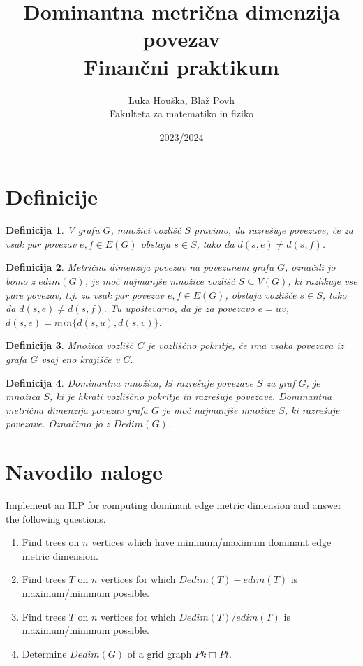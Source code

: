 \documentclass[a4paper,12pt]{article}
\title{Dominantna metrična dimenzija povezav \\ 
\Large Finančni praktikum}
\author{Luka Houška, Blaž Povh \\
Fakulteta za matematiko in fiziko}
\date{2023/2024}
\newtheorem{definicija}{Definicija}
\begin{document}
\maketitle

\section{Definicije}
    \begin{definicija}
        V grafu $G$, množici vozlišč $S$ pravimo, da razrešuje povezave, če za vsak par povezav $e, f \in E(G)$ obstaja $s \in S$, tako da $d(s, e) \neq  d(s, f)$.
    \end{definicija}

    \begin{definicija}
        Metrična dimenzija povezav na  povezanem grafu $G$, označili jo bomo z $edim(G)$, je moč najmanjše množice vozlišč $S\subseteq V(G)$, ki razlikuje vse pare povezav, t.j. za vsak par povezav $e, f \in E(G)$, obstaja vozlišče $s \in S$, tako da $d(s, e) \neq d(s, f )$. Tu upoštevamo, da je za povezavo $e=uv$, $d(s, e) = min\{d(s, u), d(s, v)\}$.
    \end{definicija}
        
    \begin{definicija}
        Množica vozlišč $C$ je \emph{vozliščno pokritje}, če ima vsaka povezava iz grafa $G$ vsaj eno krajišče v $C$.
    \end{definicija}

    \begin{definicija}
        Dominantna množica, ki razrešuje povezave $S$ za graf $G$, je množica $S$, ki je hkrati vozliščno pokritje in razrešuje povezave. Dominantna metrična dimenzija povezav grafa $G$ je moč najmanjše množice $S$, ki razrešuje povezave. Označimo jo z $Dedim(G)$.
    \end{definicija}

\section{Navodilo naloge}
    Implement an ILP for computing dominant edge metric dimension and answer the following questions.
    \begin{enumerate}
        \item Find trees on $n$ vertices which have minimum/maximum dominant edge metric dimension.
        \item Find trees $T$ on $n$ vertices for which $Dedim(T) - edim(T)$ is maximum/minimum possible.
        \item Find trees $T$ on $n$ vertices for which $Dedim(T)/ edim(T)$ is maximum/minimum possible.
        \item Determine $Dedim(G)$ of a grid graph $Pk \Box Pt$.
    \end{enumerate}
\end{document}
